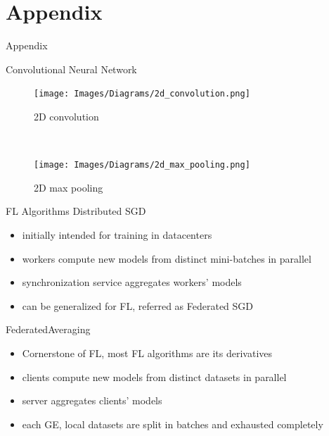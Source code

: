 \setlength{\parskip}{\baselineskip}
\section{Appendix}


\begin{frame}
	\huge Appendix
\end{frame}

\begin{frame}{Convolutional Neural Network}
    \begin{figure}
        \centering
        \texttt{[image: Images/Diagrams/2d\_convolution.png]}
        \caption{2D convolution}
    \end{figure}\\
    \begin{figure}
        \centering
        \texttt{[image: Images/Diagrams/2d\_max\_pooling.png]}
        \caption{2D max pooling}
    \end{figure}%
\end{frame}

\begin{frame}{FL Algorithms}
   Distributed SGD\\
    \begin{itemize}
        \item initially intended for training in datacenters
        \item workers compute new models from distinct mini-batches in parallel
        \item synchronization service aggregates workers' models
        \item can be generalized for FL, referred as Federated SGD
    \end{itemize}
    FederatedAveraging\\
    \begin{itemize}
        \item Cornerstone of FL, most FL algorithms are its derivatives
        \item clients compute new models from distinct datasets in parallel
        \item server aggregates clients' models
        \item each GE, local datasets are split in batches and exhausted completely
    \end{itemize}%
\end{frame}

